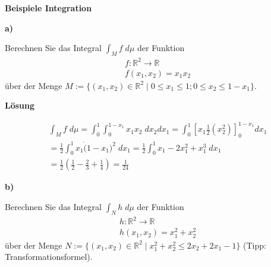 \documentclass[a4paper,12pt]{article}
\begin{document}
{\bf Beispiele Integration}

{\bf a) }

Berechnen Sie das Integral $\int_{M} f \; d \mu$ der Funktion 
\begin{align*}
& f : \mathbb{R}^2 \to  \mathbb{R} \\
 & f(x_1, x_2) =x_1  x_2
\end{align*}
über der Menge 
$M := \{ (x_1, x_2)  \in \mathbb{R}^2 \; | \; 0 \leq x_1  \leq 1; 0 \leq x_2 \leq 1 -x_1 \}$.

\hspace{5mm}


{\bf Lösung} 

\begin{align*}
& \int_{M} f \; d \mu = \int_{0}^{1}  \int_{0}^{1 -x_1}  x_1 x_2 \; dx_2  dx_1 =  \int_{0}^{1} [ x_1 \frac{1}{2}(x_2^2) ]_{0}^{1-x_1} dx_1 \\
& = \frac{1}{2}  \int_{0}^{1}x_1 \dot (1 - x_1)^2 \; dx_1 = \frac{1}{2}  \int_{0}^{1}x_1 - 2x_1^2 + x_1^3 \; dx_1\\
& =  \frac{1}{2}  ( \frac{1}{2}   -  \frac{2}{3}  +  \frac{1}{4}   ) =  \frac{1}{24} 
\end{align*}

{\bf b) }

Berechnen Sie das Integral   $\int_{N} h \; d \mu$ der Funktion 
\begin{align*}
& h : \mathbb{R}^2 \to  \mathbb{R} \\
& h(x_1, x_2) =  x_1^2 + x_2^2
\end{align*}
über der Menge
$N := \{  (x_1, x_2)   \in \mathbb{R}^2 \; | \;  x_1^2 + x_2^2 \leq 2 x_2   + 2x_1 -1 \}$
(Tipp: Transformationsformel).
\end{document}
